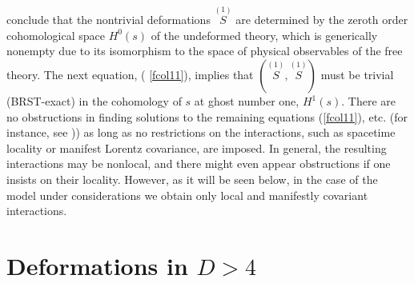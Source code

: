 \documentclass[a4paper,12pt]{article}
\begin{document}
conclude that the nontrivial deformations $\stackrel{(1)}{S}$ are determined
by the zeroth order cohomological space $H^{0}\left( s\right) $ of the
undeformed theory, which is generically nonempty due to its isomorphism to
the space of physical observables of the free theory. The next equation, (%
\ref{fcol11}), implies that $\left( \stackrel{(1)}{S},\stackrel{(1)}{S}%
\right) $ must be trivial (BRST-exact) in the cohomology of $s$ at ghost
number one, $H^{1}\left( s\right) $. There are no obstructions in finding
solutions to the remaining equations (\ref{fcol11}), etc. (for instance, see 
\cite{21and5})) as long as no restrictions on the interactions, such as
spacetime locality or manifest Lorentz covariance, are imposed. In general,
the resulting interactions may be nonlocal, and there might even appear
obstructions if one insists on their locality. However, as it will be seen
below, in the case of the model under considerations we obtain only local
and manifestly covariant interactions.

\section{Deformations in $D>4$}
\end{document}
